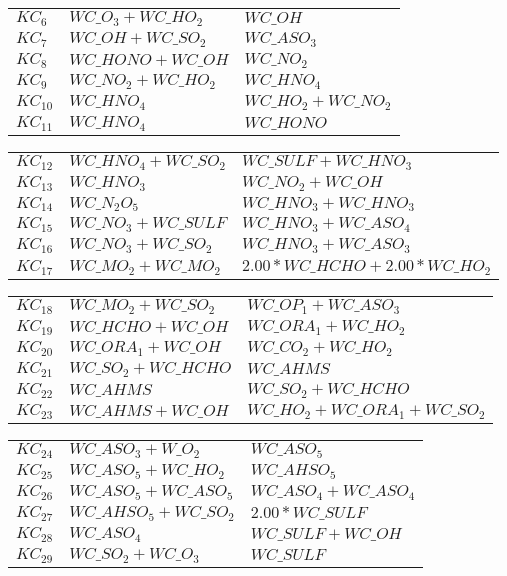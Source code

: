 {\begin{tabular}{l@{\,:\,}p{0.2\chfwidth}@{$\quad\longrightarrow\quad$}p{0.6\chfwidth}}
$KC_{6}$ & $WC\_O_{3}+WC\_HO_{2}$ & $WC\_OH$ \\
$KC_{7}$ & $WC\_OH+WC\_SO_{2}$ & $WC\_ASO_{3}$ \\
$KC_{8}$ & $WC\_HONO+WC\_OH$ & $WC\_NO_{2}$ \\
$KC_{9}$ & $WC\_NO_{2}+WC\_HO_{2}$ & $WC\_HNO_{4}$ \\
$KC_{10}$ & $WC\_HNO_{4}$ & $WC\_HO_{2}+WC\_NO_{2}$ \\
$KC_{11}$ & $WC\_HNO_{4}$ & $WC\_HONO$ \\
\end{tabular}
 
\begin{tabular}{l@{\,:\,}p{0.2\chfwidth}@{$\quad\longrightarrow\quad$}p{0.6\chfwidth}}
$KC_{12}$ & $WC\_HNO_{4}+WC\_SO_{2}$ & $WC\_SULF+WC\_HNO_{3}$ \\
$KC_{13}$ & $WC\_HNO_{3}$ & $WC\_NO_{2}+WC\_OH$ \\
$KC_{14}$ & $WC\_N_{2}O_{5}$ & $WC\_HNO_{3}+WC\_HNO_{3}$ \\
$KC_{15}$ & $WC\_NO_{3}+WC\_SULF$ & $WC\_HNO_{3}+WC\_ASO_{4}$ \\
$KC_{16}$ & $WC\_NO_{3}+WC\_SO_{2}$ & $WC\_HNO_{3}+WC\_ASO_{3}$ \\
$KC_{17}$ & $WC\_MO_{2}+WC\_MO_{2}$ & $2.00*WC\_HCHO+2.00*WC\_HO_{2}$ \\
\end{tabular}
 
\begin{tabular}{l@{\,:\,}p{0.2\chfwidth}@{$\quad\longrightarrow\quad$}p{0.6\chfwidth}}
$KC_{18}$ & $WC\_MO_{2}+WC\_SO_{2}$ & $WC\_OP_{1}+WC\_ASO_{3}$ \\
$KC_{19}$ & $WC\_HCHO+WC\_OH$ & $WC\_ORA_{1}+WC\_HO_{2}$ \\
$KC_{20}$ & $WC\_ORA_{1}+WC\_OH$ & $WC\_CO_{2}+WC\_HO_{2}$ \\
$KC_{21}$ & $WC\_SO_{2}+WC\_HCHO$ & $WC\_AHMS$ \\
$KC_{22}$ & $WC\_AHMS$ & $WC\_SO_{2}+WC\_HCHO$ \\
$KC_{23}$ & $WC\_AHMS+WC\_OH$ & $WC\_HO_{2}+WC\_ORA_{1}+WC\_SO_{2}$ \\
\end{tabular}
 
\begin{tabular}{l@{\,:\,}p{0.2\chfwidth}@{$\quad\longrightarrow\quad$}p{0.6\chfwidth}}
$KC_{24}$ & $WC\_ASO_{3}+W\_O_{2}$ & $WC\_ASO_{5}$ \\
$KC_{25}$ & $WC\_ASO_{5}+WC\_HO_{2}$ & $WC\_AHSO_{5}$ \\
$KC_{26}$ & $WC\_ASO_{5}+WC\_ASO_{5}$ & $WC\_ASO_{4}+WC\_ASO_{4}$ \\
$KC_{27}$ & $WC\_AHSO_{5}+WC\_SO_{2}$ & $2.00*WC\_SULF$ \\
$KC_{28}$ & $WC\_ASO_{4}$ & $WC\_SULF+WC\_OH$ \\
$KC_{29}$ & $WC\_SO_{2}+WC\_O_{3}$ & $WC\_SULF$ \\
\end{tabular}
 
}
